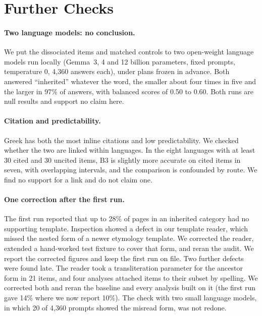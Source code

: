 \documentclass[11pt]{article}
\begin{document}
\section{Further Checks}
\label{app:further}

\paragraph{Two language models: no conclusion.} We put the dissociated items and matched controls to two open-weight language models run locally (Gemma~3, 4 and 12 billion parameters, fixed prompts, temperature 0, 4,360 answers each), under plans frozen in advance. Both answered ``inherited'' whatever the word, the smaller about four times in five and the larger in 97\% of answers, with balanced scores of 0.50 to 0.60. Both runs are null results and support no claim here.

\paragraph{Citation and predictability.} Greek has both the most inline citations and low predictability. We checked whether the two are linked within languages. In the eight languages with at least 30 cited and 30 uncited items, B3 is slightly more accurate on cited items in seven, with overlapping intervals, and the comparison is confounded by route. We find no support for a link and do not claim one.

\paragraph{One correction after the first run.} The first run reported that up to 28\% of pages in an inherited category had no supporting template. Inspection showed a defect in our template reader, which missed the nested form of a newer etymology template. We corrected the reader, extended a hand-worked test fixture to cover that form, and reran the audit. We report the corrected figures and keep the first run on file. Two further defects were found late. The reader took a transliteration parameter for the ancestor form in 21 items, and four analyses attached items to their subset by spelling. We corrected both and reran the baseline and every analysis built on it (the first run gave 14\% where we now report 10\%). The check with two small language models, in which 20 of 4,360 prompts showed the misread form, was not redone.
\end{document}
